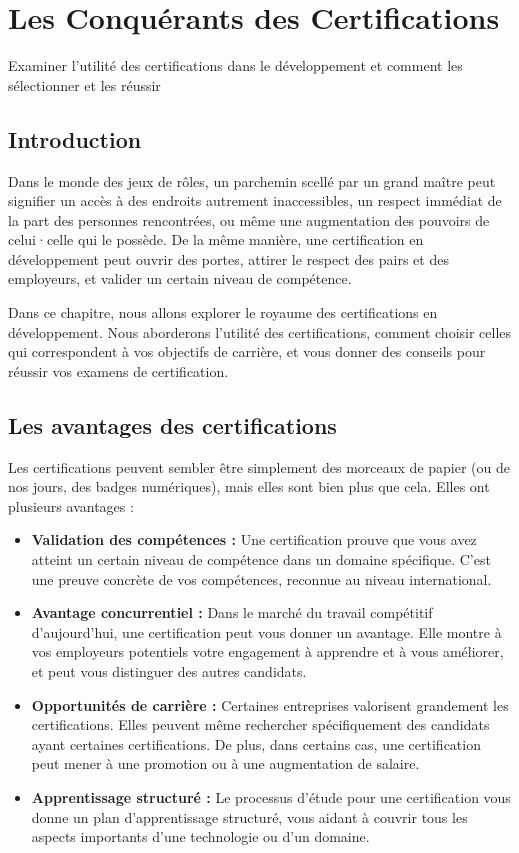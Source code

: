 \chapter{Les Conquérants des Certifications}

Examiner l'utilité des certifications dans le développement et comment les sélectionner et les réussir

\section{Introduction}

Dans le monde des jeux de rôles, un parchemin scellé par un grand maître peut signifier un accès à des endroits autrement inaccessibles, un respect immédiat de la part des personnes rencontrées, ou même une augmentation des pouvoirs de celui·celle qui le possède. De la même manière, une certification en développement peut ouvrir des portes, attirer le respect des pairs et des employeurs, et valider un certain niveau de compétence.

Dans ce chapitre, nous allons explorer le royaume des certifications en développement. Nous aborderons l'utilité des certifications, comment choisir celles qui correspondent à vos objectifs de carrière, et vous donner des conseils pour réussir vos examens de certification.

\section{Les avantages des certifications}

Les certifications peuvent sembler être simplement des morceaux de papier (ou de nos jours, des badges numériques), mais elles sont bien plus que cela. Elles ont plusieurs avantages :

\begin{itemize}
    \item \textbf{Validation des compétences :} Une certification prouve que vous avez atteint un certain niveau de compétence dans un domaine spécifique. C'est une preuve concrète de vos compétences, reconnue au niveau international.
    \item \textbf{Avantage concurrentiel :} Dans le marché du travail compétitif d'aujourd'hui, une certification peut vous donner un avantage. Elle montre à vos employeurs potentiels votre engagement à apprendre et à vous améliorer, et peut vous distinguer des autres candidats.
    \item \textbf{Opportunités de carrière :} Certaines entreprises valorisent grandement les certifications. Elles peuvent même rechercher spécifiquement des candidats ayant certaines certifications. De plus, dans certains cas, une certification peut mener à une promotion ou à une augmentation de salaire.
    \item \textbf{Apprentissage structuré :} Le processus d'étude pour une certification vous donne un plan d'apprentissage structuré, vous aidant à couvrir tous les aspects importants d'une technologie ou d'un domaine.
\end{itemize}

